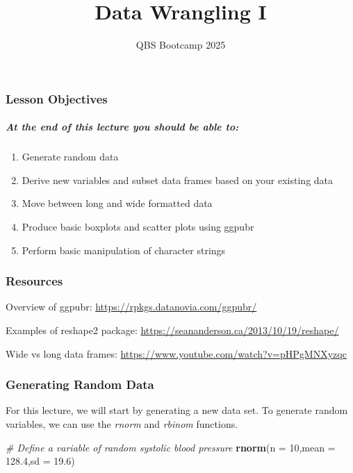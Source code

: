 \documentclass[
]{article}
\title{Data Wrangling I}
\author{QBS Bootcamp 2025}
\date{}
\newenvironment{Shaded}{\begin{snugshade}}{\end{snugshade}}
\newcommand{\AttributeTok}[1]{\textcolor[rgb]{0.13,0.29,0.53}{#1}}
\newcommand{\CommentTok}[1]{\textcolor[rgb]{0.56,0.35,0.01}{\textit{#1}}}
\newcommand{\DecValTok}[1]{\textcolor[rgb]{0.00,0.00,0.81}{#1}}
\newcommand{\FloatTok}[1]{\textcolor[rgb]{0.00,0.00,0.81}{#1}}
\newcommand{\FunctionTok}[1]{\textcolor[rgb]{0.13,0.29,0.53}{\textbf{#1}}}
\newcommand{\NormalTok}[1]{#1}
\providecommand{\tightlist}{%
  \setlength{\itemsep}{0pt}\setlength{\parskip}{0pt}}
\begin{document}
\maketitle

\subsubsection{Lesson Objectives}\label{lesson-objectives}

\subparagraph{At the end of this lecture you should be able
to:}\label{at-the-end-of-this-lecture-you-should-be-able-to}

\begin{enumerate}
\def\labelenumi{\arabic{enumi}.}
\tightlist
\item
  Generate random data
\item
  Derive new variables and subset data frames based on your existing
  data
\item
  Move between long and wide formatted data
\item
  Produce basic boxplots and scatter plots using ggpubr
\item
  Perform basic manipulation of character strings
\end{enumerate}

\subsubsection{Resources}\label{resources}

Overview of ggpubr: \url{https://rpkgs.datanovia.com/ggpubr/}

Examples of reshape2 package:
\url{https://seananderson.ca/2013/10/19/reshape/}

Wide vs long data frames:
\url{https://www.youtube.com/watch?v=pHPgMNXyzqc} \(~\)

\subsubsection{Generating Random Data}\label{generating-random-data}

For this lecture, we will start by generating a new data set. To
generate random variables, we can use the \emph{rnorm} and \emph{rbinom}
functions.

\begin{Shaded}
\begin{Highlighting}[]
\CommentTok{\# Define a variable of random systolic blood pressure}
\FunctionTok{rnorm}\NormalTok{(}\AttributeTok{n =} \DecValTok{10}\NormalTok{,}\AttributeTok{mean =} \FloatTok{128.4}\NormalTok{,}\AttributeTok{sd =} \FloatTok{19.6}\NormalTok{)}
\end{Highlighting}
\end{Shaded}
\end{document}
